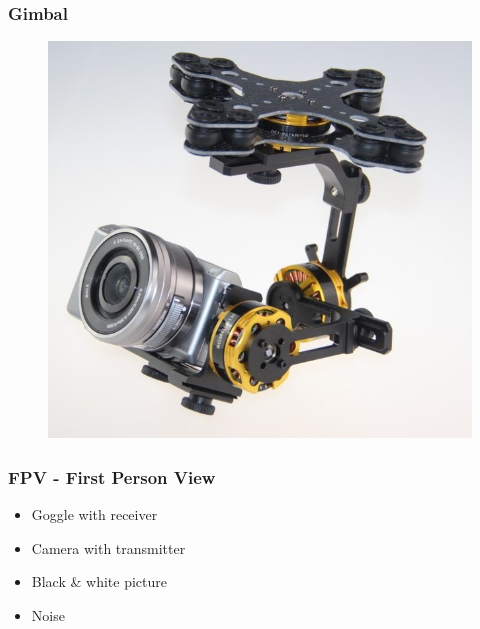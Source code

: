 \begin{frame}
\frametitle{Gimbal}

  \begin{figure}
  \includegraphics[scale=0.5]{pic/03_our-copter/gimbal.jpg}
  \end{figure}
  
\end{frame}



\begin{frame}
\frametitle{FPV - First Person View}

  \begin{itemize}
    \item Goggle with receiver
  	\item Camera with transmitter
	\item Black \& white picture
	\item Noise 
  \end{itemize}
  
\end{frame}



  

